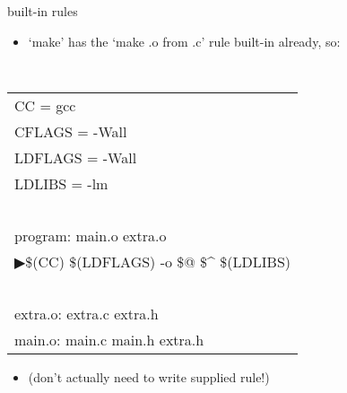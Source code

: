 
\begin{frame}{built-in rules}
\begin{itemize}
\item `make' has the `make .o from .c' rule built-in already, so:
\end{itemize}
{\tt
\begin{tabular}{l}
CC = gcc \\
CFLAGS = -Wall \\
LDFLAGS = -Wall \\
LDLIBS = -lm \\
~ \\
program: main.o extra.o \\
▶\hspace{1.5cm}\$(CC) \$(LDFLAGS) -o {\$@} {\$\textasciicircum} \$(LDLIBS) \\
~ \\
extra.o: extra.c extra.h \\
main.o: main.c main.h extra.h \\
\end{tabular}
}
\begin{itemize}
\item (don't actually need to write supplied rule!)
\end{itemize}
\end{frame}


